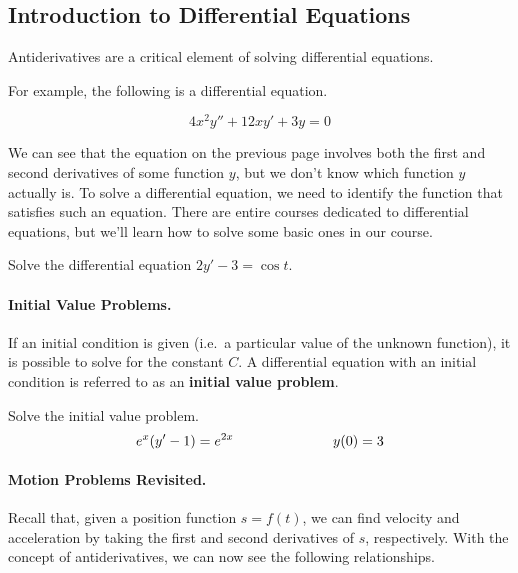 \documentclass[12pt]{article}
\begin{document}
\subsection*{Introduction to Differential Equations}

Antiderivatives are a critical element of solving differential equations.

\vspace{3mm}


\vspace{5mm} For example, the following is a differential equation.

$$4x^2y''+12xy'+3y=0$$

We can see that the equation on the previous page involves both the first and second derivatives of some function $y$, but we don't know which function $y$ actually is. To solve a differential equation, we need to identify the {function} that satisfies such an equation. There are entire courses dedicated to differential equations, but we'll learn how to solve some basic ones in our course.

\vspace{5mm}

\Example Solve the differential equation $2y'-3=\cos t$.

\vspace{60mm}

\paragraph{Initial Value Problems.} If an initial condition is given (i.e.\ a particular value of the unknown function), it is possible to solve for the constant $C$. A differential equation with an initial condition is referred to as an \textbf{initial value problem}.

\vspace{5mm}

\Example Solve the initial value problem.
$$e^x(y'-1)=e^{2x}\hspace{25mm} y(0)=3$$

\newpage 

\paragraph{Motion Problems Revisited.} Recall that, given a position function $s=f(t)$, we can find velocity and acceleration by taking the first and second derivatives of $s$, respectively. With the concept of antiderivatives, we can now see the following relationships.
\end{document}
